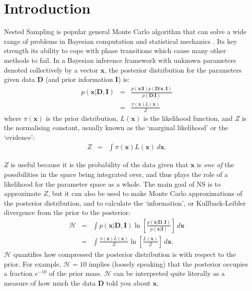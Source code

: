 \documentclass[journal,article,accept,moreauthors,pdftex,12pt,a4paper]{mdpi}
\newcommand{\xx}{\boldsymbol{x}}
\newcommand{\dx}{d\boldsymbol{x}}
\newcommand{\data}{\boldsymbol{D}}
\newcommand{\II}{\boldsymbol{I}}
\begin{document}

\section{Introduction}

Nested Sampling \citep[NS][]{skilling} is popular general
Monte Carlo algorithm that can solve a wide range of problems in Bayesian
computation and statistical mechanics
\citep{2009arXiv0906.3544P, 2014PhRvE..89b2302P, 2015arXiv150303404B}.
Its key strength its ability to cope with phase transitions which cause
many other methods to fail.
In a Bayesian inference framework with unknown parameters denoted collectively
by a vector $\xx$, the
posterior distribution for the parameters given data $\data$ (and prior
information $\II$) is:
\begin{eqnarray}
p(\xx | \data, \II) &=&
\frac{p(\xx | \II)p(\data | \xx, \II)}{p(\data | \II)}\\
&=& \frac{\pi(\xx)L(\xx)}{Z}
\end{eqnarray}
where $\pi(\xx)$ is the prior distribution, $L(\xx)$ is the likelihood
function, and $Z$ is the normalising constant, usually known as the
`marginal likelihood' or the `evidence':
\begin{eqnarray}
Z &=& \int \pi(\xx) L(\xx) \, \dx.\label{eqn:evidence}
\end{eqnarray}

$Z$ is useful because it is the probability of the data given that
$\xx$ is {\em one of}
the possibilities in the space being integrated over, and thus plays the role
of a likelihood for the parameter space as a whole.
The main goal of NS is to approximate $Z$, but it can also be used to make
Monte Carlo approximations of the posterior distribution, and to
calculate the `information',
or Kullback-Leibler divergence from the prior to the posterior:
\begin{eqnarray}
\mathcal{H} &=& \int p(\xx | \data, \II) \ln
\left[\frac{p(\xx | \data, \II)}{p(\xx | \II)}\right] \, d\xx \\
&=& \int \frac{\pi(\xx) L(\xx)}{Z} \ln
\left[\frac{L(\xx)}{Z}\right] \, d\xx.
\end{eqnarray}
$\mathcal{H}$ quantifies how compressed the posterior distribution is with
respect to the prior. For example, $\mathcal{H} = 10$ implies (loosely speaking)
that the posterior occupies a fraction $e^{-10}$ of the prior mass.
$\mathcal{H}$ can be interpreted quite literally as a measure of how much
the data $\data$ told you about $\xx$.
\end{document}
